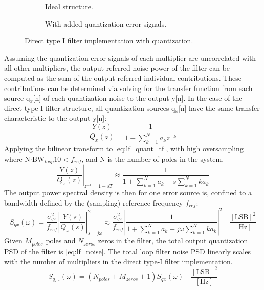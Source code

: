 		\begin{figure}[htb!]
		    \centering
		    \begin{subfigure}{0.5\textwidth}
		        \centering
		        
		        \vspace{1.2em}
		        \caption{Ideal structure.}
		        \label{fig:direct_type_1_ideal}
		    \end{subfigure}%
		    \begin{subfigure}{0.5\textwidth}
		        \centering
		        
		        \caption{With added quantization error signals.}
		        \label{fig:direct_type_1_quant}
		    \end{subfigure}
		    \label{fig:direct_type_1}
		    \caption{Direct type I filter implementation with quantization.}
		\end{figure}
		\FloatBarrier
		Assuming the quantization error signals of each multiplier are uncorrelated with all other multipliers, the output-referred noise power of the filter can be computed as the sum of the output-referred individual contributions. These contributions can be determined via solving for the transfer function from each source q$_x$[n] of each quantization noise to the output y[n]. In the case of the direct type I filter structure, all quantization sources q$_x$[n] have the same transfer characteristic to the output y[n]:
		\begin{equation}
			\frac{Y(z)}{Q_x(z)} = \frac{1}{1+\sum_{k=1}^N a_kz^{-k}}\label{eq:lf_quant_tf}
		\end{equation}
		Applying the bilinear transform to \ref{eq:lf_quant_tf}, with high oversampling where N$\cdot \text{BW}_{loop} 10 < f_{ref}$, and N is the number of poles in the system.
		\begin{equation}
			\left.\frac{Y(z)}{Q_x(z)}\right\vert_{z^{-1}=1-sT} \approx \frac{1}{1+\sum_{k=1}^N a_k - s\sum_{k=1}^N ka_k}\label{eq:lf_quant_tf_s}
		\end{equation}
		The output power spectral density is then for one error source is, confined to a bandwidth defined by the (sampling) reference frequency $f_{ref}$:
		\begin{equation}
			S_{qx}(\omega) = \frac{\sigma_{qx}^2}{f_{ref}}\left|\frac{Y(s)}{Q_x(s)}\right|^2_{s=j\omega} \approx \frac{\sigma_{qx}^2}{f_{ref}}\left|\frac{1}{1+\sum_{k=1}^N a_k - j\omega\sum_{k=1}^N ka_k}\right|^2\label{eq:lf_quant_tf_s} \hspace{1em}\frac{[\text{LSB}]^2}{[\text{Hz}]}
		\end{equation}
		Given $M_{poles}$ poles and $N_{zeros}$ zeros in the filter, the total output quantization PSD of the filter is \ref{eq:lf_noise}. The total loop filter noise PSD linearly scales with the number of multipliers in the direct type-I filter implementation.
		\begin{equation}
			S_{q_{LF}}(\omega) = (N_{poles}+M_{zeros}+1)S_{qx}(\omega) \hspace{1em}\frac{[\text{LSB}]^2}{[\text{Hz}]}\label{eq:lf_noise}
		\end{equation}


